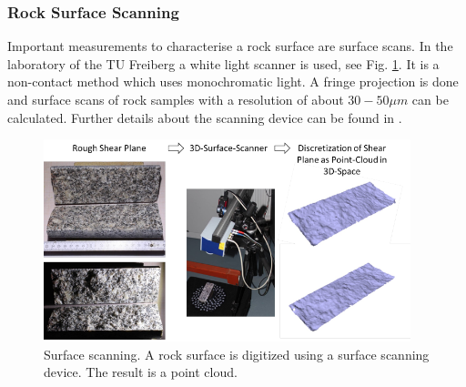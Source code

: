 \subsubsection{Rock Surface Scanning}

Important measurements to characterise a rock surface are surface scans. In the laboratory of the TU Freiberg a white light scanner is used, see Fig. \ref{TUBAFScanner}. It is a non-contact method which uses monochromatic light. A fringe projection is done and surface scans of rock samples with a resolution of about $30-50 \unit{\mu m}$ can be calculated. Further details about the scanning device can be found in \cite{TUBAFScanningDevice}. 

\begin{figure}[!ht]
\centering
\includegraphics[width=0.95\textwidth]{figures/geomint-wp3-12a}
\caption{Surface scanning. A rock surface is digitized using a surface scanning device. The result is a point cloud.}\label{TUBAFScanner}
\end{figure}